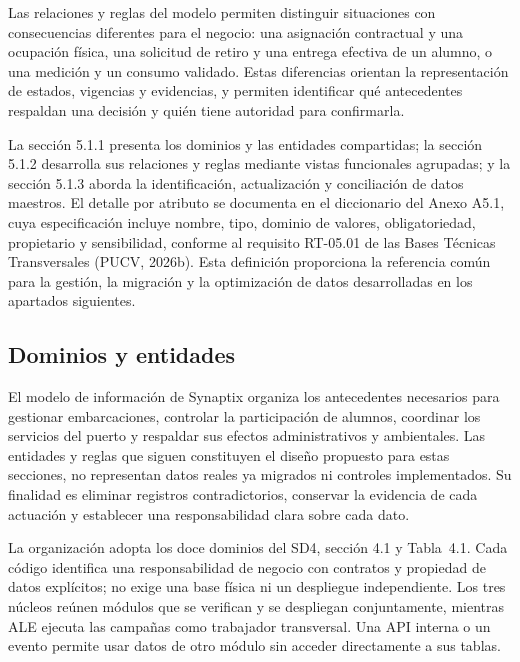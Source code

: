 Las relaciones y reglas del modelo permiten distinguir situaciones con consecuencias diferentes para el negocio: una asignación contractual y una ocupación física, una solicitud de retiro y una entrega efectiva de un alumno, o una medición y un consumo validado. Estas diferencias orientan la representación de estados, vigencias y evidencias, y permiten identificar qué antecedentes respaldan una decisión y quién tiene autoridad para confirmarla.

La sección 5.1.1 presenta los dominios y las entidades compartidas; la sección 5.1.2 desarrolla sus relaciones y reglas mediante vistas funcionales agrupadas; y la sección 5.1.3 aborda la identificación, actualización y conciliación de datos maestros. El detalle por atributo se documenta en el diccionario del Anexo A5.1, cuya especificación incluye nombre, tipo, dominio de valores, obligatoriedad, propietario y sensibilidad, conforme al requisito RT-05.01 de las Bases Técnicas Transversales (PUCV, 2026b). Esta definición proporciona la referencia común para la gestión, la migración y la optimización de datos desarrolladas en los apartados siguientes.

\subsection{Dominios y entidades} %
El modelo de información de Synaptix organiza los antecedentes necesarios para gestionar embarcaciones, controlar la participación de alumnos, coordinar los servicios del puerto y respaldar sus efectos administrativos y ambientales.
Las entidades y reglas que siguen constituyen el diseño propuesto para estas secciones, no representan datos reales ya migrados ni controles implementados. Su finalidad es eliminar registros contradictorios, conservar la evidencia de cada actuación y establecer una responsabilidad clara sobre cada dato. %

La organización adopta los doce dominios del SD4, sección 4.1 y Tabla~4.1. Cada código identifica una responsabilidad de negocio con contratos y propiedad de datos explícitos; no exige una base física ni un despliegue independiente. Los tres núcleos reúnen módulos que se verifican y se despliegan conjuntamente, mientras ALE ejecuta las campañas como trabajador transversal. Una API interna o un evento permite usar datos de otro módulo sin acceder directamente a sus tablas.


